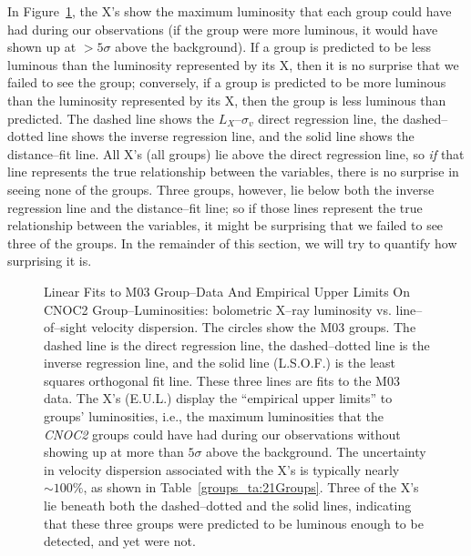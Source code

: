 In Figure~\ref{groups_fig:maxlums}, the X's show the maximum
luminosity that each group could have had during our observations (if
the group were more luminous, it would have shown up at $>5\sigma$
above the background).  If a group is predicted to be less luminous
than the luminosity represented by its X, then it is no surprise that
we failed to see the group; conversely, if a group is predicted to be
more luminous than the luminosity represented by its X, then the group
is less luminous than predicted.  The dashed line shows the
$L_X$--$\sigma_v$ direct regression line, the dashed--dotted line
shows the inverse regression line, and the solid line shows the
distance--fit line.  All X's (all groups) lie above the direct
regression line, so \emph{if} that line represents the true
relationship between the variables, there is no surprise in seeing
none of the groups.  Three groups, however, lie below both the inverse
regression line and the distance--fit line; so if those lines
represent the true relationship between the variables, it might be
surprising that we failed to see three of the groups.  In the
remainder of this section, we will try to quantify how surprising it
is.

\begin{figure}[p]
\caption[Linear Fits to M03 Group--Data And Empirical Upper Limits On
CNOC2 Group--Luminosities.]{Linear Fits to M03 Group--Data And
Empirical Upper Limits On CNOC2 Group--Luminosities: bolometric X--ray
luminosity vs. line--of--sight velocity dispersion.  The circles show
the M03 groups. The dashed line is the direct regression line, the
dashed--dotted line is the inverse regression line, and the solid line
(L.S.O.F.) is the least squares orthogonal fit line.  These three
lines are fits to the M03 data.  The X's (E.U.L.) display the
``empirical upper limits'' to groups' luminosities, i.e., the maximum
luminosities that the \textsl{CNOC2} groups could have had during our
observations without showing up at more than $5\sigma$ above the
background.  The uncertainty in velocity dispersion associated with
the X's is typically nearly $\sim100\%$, as shown in
Table~\ref{groups_ta:21Groups}.  Three of the X's lie beneath both the
dashed--dotted and the solid lines, indicating that these three groups
were predicted to be luminous enough to be detected, and yet were not.
}
\label{groups_fig:maxlums}
\end{figure}
\afterpage{\clearpage}

